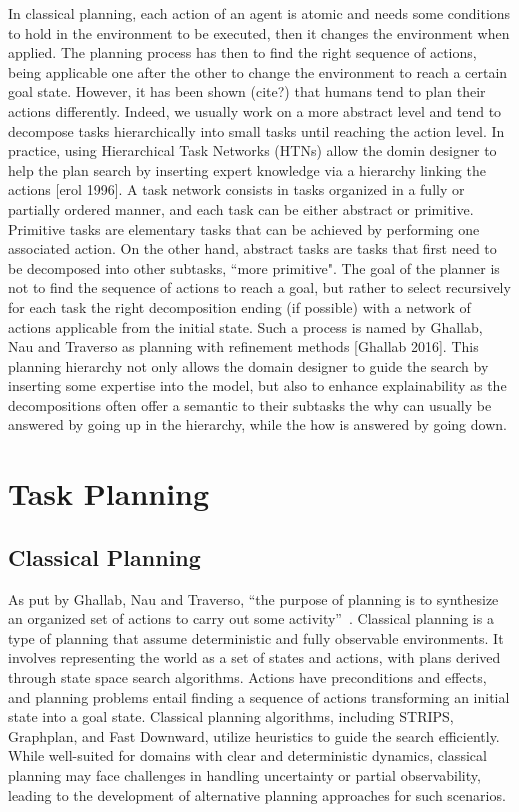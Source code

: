 In classical planning, each action of an agent is atomic and needs some conditions to hold in the environment to be executed, then it changes the environment when applied. The planning process has then to find the right sequence of actions, being applicable one after the other to change the environment to reach a certain goal state. 
However, it has been shown (cite?) that humans tend to plan their actions differently. Indeed, we usually work on a more abstract level and tend to decompose tasks hierarchically into small tasks until reaching the action level. In practice, using Hierarchical Task Networks (HTNs) allow the domin designer to help the plan search by inserting expert knowledge via a hierarchy linking the actions [erol 1996]. A task network consists in tasks organized in a fully or partially ordered manner, and each task can be either abstract or primitive. Primitive tasks are elementary tasks that can be achieved by performing one associated action. On the other hand, abstract tasks are tasks that first need to be decomposed into other subtasks, ``more primitive". The goal of the planner is not to find the sequence of actions to reach a goal, but rather to select recursively for each task the right decomposition ending (if possible) with a network of actions applicable from the initial state. Such a process is named by Ghallab, Nau and Traverso as planning with refinement methods [Ghallab 2016]. This planning hierarchy not only allows the domain designer to guide the search by inserting some expertise into the model, but also to enhance explainability as the decompositions often offer a semantic to their subtasks the why can usually be answered by going up in the hierarchy, while the how is answered by going down. 

\section{Task Planning}

\subsection{Classical Planning}

As put by Ghallab, Nau and Traverso, “the purpose of planning is to synthesize an organized set of actions to carry out some activity”~\cite{ghallab2016automated}. 
Classical planning is a type of planning that assume deterministic and fully observable environments. It involves representing the world as a set of states and actions, with plans derived through state space search algorithms. Actions have preconditions and effects, and planning problems entail finding a sequence of actions transforming an initial state into a goal state. Classical planning algorithms, including STRIPS, Graphplan, and Fast Downward, utilize heuristics to guide the search efficiently. While well-suited for domains with clear and deterministic dynamics, classical planning may face challenges in handling uncertainty or partial observability, leading to the development of alternative planning approaches for such scenarios.

